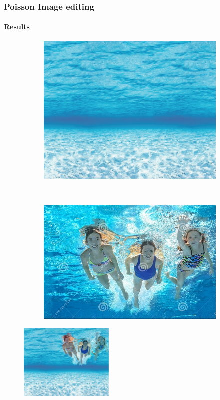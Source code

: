\documentclass[11pt]{beamer}
\begin{document}
\begin{frame}
\frametitle{Poisson Image editing}
\framesubtitle{Results}
\begin{figure}
    \centering
    \begin{subfigure}[b]{0.36\textwidth}
        \includegraphics[width=\textwidth]{the_sea}

    \end{subfigure}
    ~ 
        \begin{subfigure}[b]{0.4\textwidth}
        \includegraphics[width=\textwidth]{family}

    \end{subfigure}



\end{figure}

\begin{figure}
\includegraphics[width=0.4\textwidth]{family_sea}
\end{figure}
\end{frame}
\end{document}
